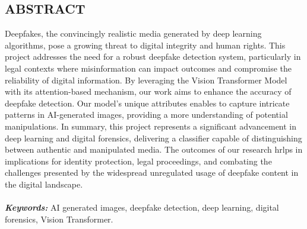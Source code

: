 \begin{center}


    \section*{ABSTRACT}
    \justify

    Deepfakes, the convincingly realistic  media generated by deep learning algorithms, pose a growing threat to digital integrity and human rights. This project addresses the need for a robust deepfake detection system, particularly in legal contexts where misinformation can impact outcomes and compromise the reliability of digital information. By leveraging the Vision Transformer Model with its attention-based mechanism, our work aims to enhance the accuracy of deepfake detection. Our model's unique attributes enables to capture intricate patterns in AI-generated images, providing a more understanding of potential manipulations. In summary, this project represents a significant advancement in deep learning and digital forensics, delivering a classifier capable of distinguishing between authentic and manipulated media. The outcomes of our research hrlps in implications for identity protection, legal proceedings, and combating the challenges presented by the widespread unregulated usage of deepfake content in the digital landscape.\\
    \\
    \textit{\textbf{Keywords:}} AI generated images, deepfake detection, deep learning, digital forensics, Vision Transformer.


\end{center}